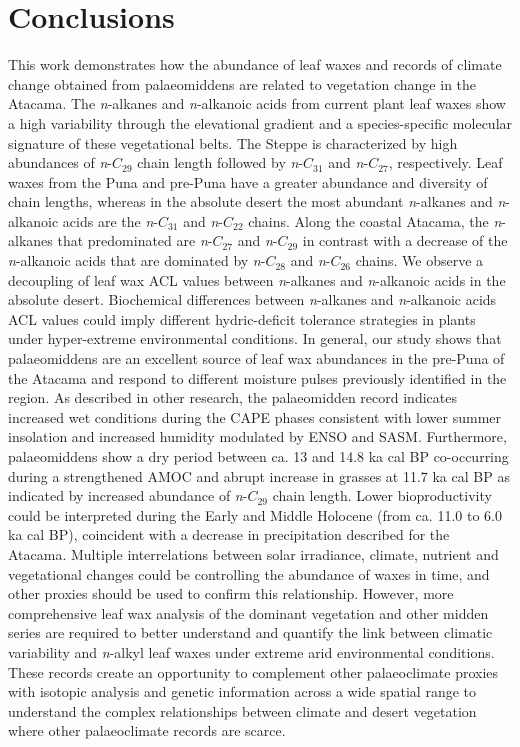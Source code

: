 \documentclass[
  authoryear,
  preprint,
  3p]{elsarticle}
\begin{document}
\hypertarget{conclusions}{%
\section{Conclusions}\label{conclusions}}

This work demonstrates how the abundance of leaf waxes and records of
climate change obtained from palaeomiddens are related to vegetation
change in the Atacama. The \emph{n}-alkanes and \emph{n}-alkanoic acids
from current plant leaf waxes show a high variability through the
elevational gradient and a species-specific molecular signature of these
vegetational belts. The Steppe is characterized by high abundances of
\emph{n}-\(C_{29}\) chain length followed by \emph{n}-\(C_{31}\) and
\emph{n}-\(C_{27}\), respectively. Leaf waxes from the Puna and pre-Puna
have a greater abundance and diversity of chain lengths, whereas in the
absolute desert the most abundant \emph{n}-alkanes and \emph{n}-alkanoic
acids are the \emph{n}-\(C_{31}\) and \emph{n}-\(C_{22}\) chains. Along
the coastal Atacama, the \emph{n}-alkanes that predominated are
\emph{n}-\(C_{27}\) and \emph{n}-\(C_{29}\) in contrast with a decrease
of the \emph{n}-alkanoic acids that are dominated by \emph{n}-\(C_{28}\)
and \emph{n}-\(C_{26}\) chains. We observe a decoupling of leaf wax ACL
values between \emph{n}-alkanes and \emph{n}-alkanoic acids in the
absolute desert. Biochemical differences between \emph{n}-alkanes and
\emph{n}-alkanoic acids ACL values could imply different hydric-deficit
tolerance strategies in plants under hyper-extreme environmental
conditions. In general, our study shows that palaeomiddens are an
excellent source of leaf wax abundances in the pre-Puna of the Atacama
and respond to different moisture pulses previously identified in the
region. As described in other research, the palaeomidden record
indicates increased wet conditions during the CAPE phases consistent
with lower summer insolation and increased humidity modulated by ENSO
and SASM. Furthermore, palaeomiddens show a dry period between ca. 13
and 14.8 ka cal BP co-occurring during a strengthened AMOC and abrupt
increase in grasses at 11.7 ka cal BP as indicated by increased
abundance of \emph{n}-\(C_{29}\) chain length. Lower bioproductivity
could be interpreted during the Early and Middle Holocene (from ca. 11.0
to 6.0 ka cal BP), coincident with a decrease in precipitation described
for the Atacama. Multiple interrelations between solar irradiance,
climate, nutrient and vegetational changes could be controlling the
abundance of waxes in time, and other proxies should be used to confirm
this relationship. However, more comprehensive leaf wax analysis of the
dominant vegetation and other midden series are required to better
understand and quantify the link between climatic variability and
\emph{n}-alkyl leaf waxes under extreme arid environmental conditions.
These records create an opportunity to complement other palaeoclimate
proxies with isotopic analysis and genetic information across a wide
spatial range to understand the complex relationships between climate
and desert vegetation where other palaeoclimate records are scarce.
\end{document}
